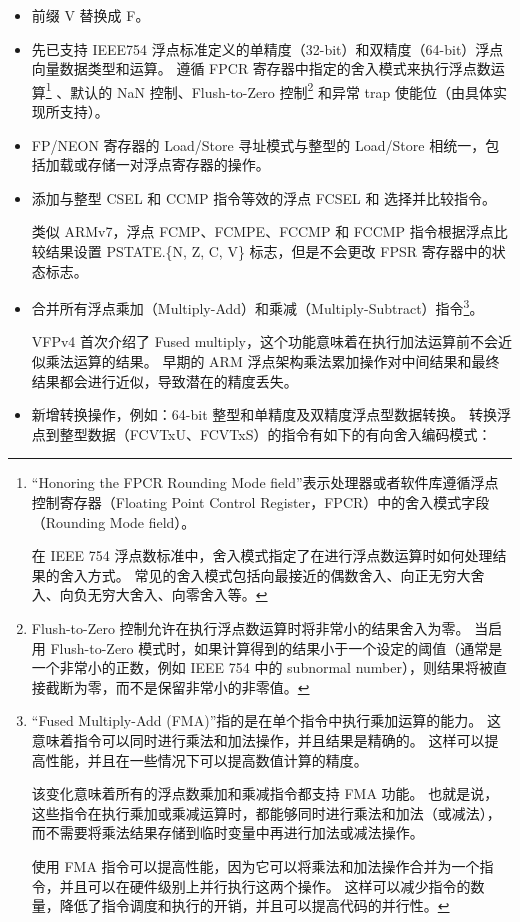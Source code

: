 \begin{itemize}
  \item 前缀 V 替换成 F。
  \item 先已支持 IEEE754 浮点标准定义的单精度（32-bit）和双精度（64-bit）浮点向量数据类型和运算。
    遵循 FPCR 寄存器中指定的舍入模式来执行浮点数运算\footnote{
    “Honoring the FPCR Rounding Mode field”表示处理器或者软件库遵循浮点控制寄存器（Floating Point Control Register，FPCR）中的舍入模式字段（Rounding Mode field）。

      在 IEEE 754 浮点数标准中，舍入模式指定了在进行浮点数运算时如何处理结果的舍入方式。
      常见的舍入模式包括向最接近的偶数舍入、向正无穷大舍入、向负无穷大舍入、向零舍入等。
    }
    、默认的 NaN 控制、Flush-to-Zero 控制\footnote{
      Flush-to-Zero 控制允许在执行浮点数运算时将非常小的结果舍入为零。
      当启用 Flush-to-Zero 模式时，如果计算得到的结果小于一个设定的阈值（通常是一个非常小的正数，例如 IEEE 754 中的 subnormal number），则结果将被直接截断为零，而不是保留非常小的非零值。
    }
    和异常 trap 使能位（由具体实现所支持）。
  \item FP/NEON 寄存器的 Load/Store 寻址模式与整型的 Load/Store 相统一，包括加载或存储一对浮点寄存器的操作。
  \item 添加与整型 CSEL 和 CCMP 指令等效的浮点 FCSEL 和 选择并比较指令。

    类似 ARMv7，浮点 FCMP、FCMPE、FCCMP 和 FCCMP 指令根据浮点比较结果设置 PSTATE.\{N, Z, C, V\} 标志，但是不会更改 FPSR 寄存器中的状态标志。
  \item 合并所有浮点乘加（Multiply-Add）和乘减（Multiply-Subtract）指令\footnote{
      “Fused Multiply-Add (FMA)”指的是在单个指令中执行乘加运算的能力。
      这意味着指令可以同时进行乘法和加法操作，并且结果是精确的。
      这样可以提高性能，并且在一些情况下可以提高数值计算的精度。

      该变化意味着所有的浮点数乘加和乘减指令都支持 FMA 功能。
      也就是说，这些指令在执行乘加或乘减运算时，都能够同时进行乘法和加法（或减法），而不需要将乘法结果存储到临时变量中再进行加法或减法操作。

      使用 FMA 指令可以提高性能，因为它可以将乘法和加法操作合并为一个指令，并且可以在硬件级别上并行执行这两个操作。
      这样可以减少指令的数量，降低了指令调度和执行的开销，并且可以提高代码的并行性。
    }。

    VFPv4 首次介绍了 Fused multiply，这个功能意味着在执行加法运算前不会近似乘法运算的结果。
    早期的 ARM 浮点架构乘法累加操作对中间结果和最终结果都会进行近似，导致潜在的精度丢失。

  \item 新增转换操作，例如：64-bit 整型和单精度及双精度浮点型数据转换。
    转换浮点到整型数据（FCVTxU、FCVTxS）的指令有如下的有向舍入编码模式：


\end{itemize}
